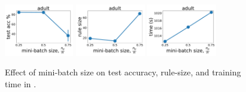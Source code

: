 \begin{figure}
	\subfloat
	{\includegraphics[width=0.27\textwidth]{figures/interpretability/relaxed-cnf/adult_test_accuracy_vary_subsamplesize.pdf}}
	\subfloat
	{\includegraphics[width=0.27\textwidth]{figures/interpretability/relaxed-cnf/adult_rule_size_vary_subsamplesize.pdf}}
	\subfloat
	{\includegraphics[width=0.27\textwidth]{figures/interpretability/relaxed-cnf/adult_time_vary_subsamplesize.pdf}} 
	\\
	
	
	\caption[Effect of mini-batch size in {\crr}]{Effect of mini-batch size on test accuracy, rule-size, and training time in {\crr}. } 
	\label{interpretability_crr_fig:result_minibatch}
\end{figure}




